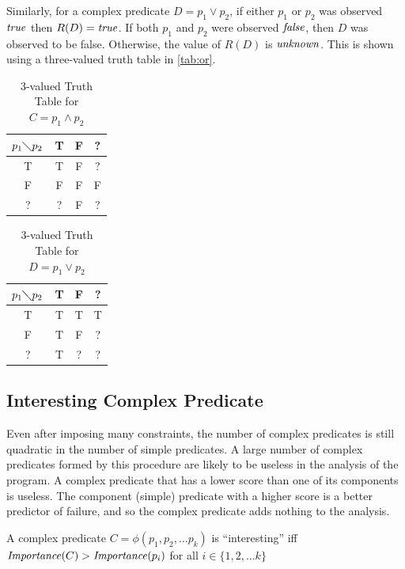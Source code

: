 Similarly, for a complex predicate $D = p_1 \vee p_2$, if either $p_1$ or $p_2$ was observed $\mathit{true}$ then $R(D) = \mathit{true}$.  If both $p_1$ and $p_2$ were observed $\mathit{false}$, then $D$ was observed to be false.  Otherwise, the value of $R(D)$ is $\mathit{unknown}$.  This is shown using a three-valued truth table in \autoref{tab:or}.

\begin{table}
  \caption{3-valued Truth Table for $C = p_1 \wedge p_2$}
  \label{tab:and}
  \centering
  \begin{tabular}{c|ccc}
    $p_1 \diagdown p_2$ & T & F & ? \\
    \hline
    T & T & F & ? \\
    F & F & F & F \\
    ? & ? & F & ? \\
  \end{tabular}
\end{table}


\begin{table}
  \caption{3-valued Truth Table for $D = p_1 \vee p_2$}
  \label{tab:or}
  \centering
  \begin{tabular}{c|ccc}
    $p_1 \diagdown p_2$ & T & F & ? \\
    \hline
    T & T & T & T \\
    F & T & F & ? \\
    ? & T & ? & ? \\
  \end{tabular}
\end{table}

\subsection{Interesting Complex Predicate}

Even after imposing many constraints, the number of complex predicates is still quadratic in the number of simple predicates.  A large number of complex predicates formed by this procedure are likely to be useless in the analysis of the program.  A complex predicate that has a lower score than one of its components is useless.  The component (simple) predicate with a higher score is a better predictor of failure, and so the complex predicate adds nothing to the analysis.

\begin{defn}
\label{dfn3}
A complex predicate $C = \phi(p_1, p_2, \ldots p_k)$ is ``interesting'' iff $\mathit{Importance}(C) > \mathit{Importance}(p_i)$ for all $i \in \{1, 2, \ldots k\}$
\end{defn}

